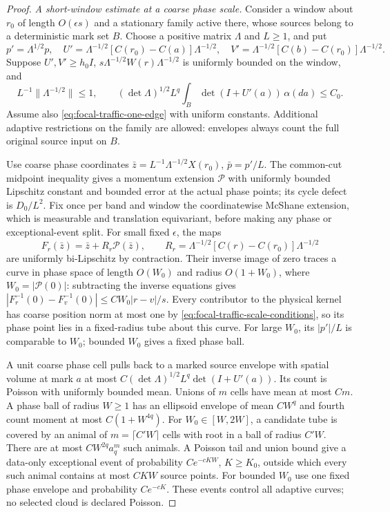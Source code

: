 \documentclass[11pt,reqno]{amsart}
\theoremstyle{definition}
\theoremstyle{remark}
\numberwithin{equation}{section}
\begin{document}
\begin{proof}
\emph{A short-window estimate at a coarse phase scale.}
Consider a window about $r_0$ of length $O(\epsilon s)$ and a
stationary family active there, whose sources belong to a deterministic
mark set $B$. Choose a positive matrix $\Lambda$ and $L\ge1$, and put
\[
 p'=\Lambda^{1/2}p,\quad
 U'=\Lambda^{-1/2}[C(r_0)-C(a)]\Lambda^{-1/2},\quad
 V'=\Lambda^{-1/2}[C(b)-C(r_0)]\Lambda^{-1/2}.
\]
Suppose $U',V'\ge h_0I$,
$s\Lambda^{-1/2}W(r)\Lambda^{-1/2}$ is uniformly bounded on the window,
and
\begin{equation}\label{eq:focal-traffic-scale-conditions}
 L^{-1}\|\Lambda^{-1/2}\|\le1,\qquad
 (\det\Lambda)^{1/2}L^q
       \int_B\det(I+U'(a))\,\alpha(da)\le C_0.
\end{equation}
Assume also \eqref{eq:focal-traffic-one-edge} with uniform constants.
Additional adaptive restrictions on the family are allowed: envelopes
always count the full original source input on $B$.

Use coarse phase coordinates
$\bar z=L^{-1}\Lambda^{-1/2}X(r_0)$, $\bar p=p'/L$.
The common-cut midpoint inequality gives a momentum extension
$\mathcal P$ with uniformly bounded Lipschitz constant and bounded
error at the actual phase points; its cycle defect is $D_0/L^2$.
Fix once per band and window the coordinatewise McShane extension,
which is measurable and translation equivariant, before making any
phase or exceptional-event split. For small fixed $\epsilon$, the maps
\[
 F_r(\bar z)=\bar z+R_r\mathcal P(\bar z),\qquad
 R_r=\Lambda^{-1/2}[C(r)-C(r_0)]\Lambda^{-1/2}
\]
are uniformly bi-Lipschitz by contraction. Their inverse image of zero
traces a curve in phase space of length $O(W_0)$ and radius $O(1+W_0)$,
where $W_0=|\mathcal P(0)|$: subtracting the inverse equations gives
$|F_r^{-1}(0)-F_v^{-1}(0)|\le C W_0|r-v|/s$.
Every contributor to the physical kernel has coarse position norm at
most one by \eqref{eq:focal-traffic-scale-conditions}, so its phase point
lies in a fixed-radius tube about this curve. For large $W_0$, its
$|p'|/L$ is comparable to $W_0$; bounded $W_0$ gives a fixed phase ball.

A unit coarse phase cell pulls back to a marked source envelope with
spatial volume at mark $a$ at most
$C(\det\Lambda)^{1/2}L^q\det(I+U'(a))$. Its count is Poisson with
uniformly bounded mean. Unions of $m$ cells have mean at most $Cm$.
A phase ball of radius $W\ge1$ has an ellipsoid envelope of mean
$CW^q$ and fourth count moment at most $C(1+W^{4q})$.
For $W_0\in[W,2W]$, a candidate tube is covered by an animal of
$m=\lceil C'W\rceil$ cells with root in a ball of radius $C'W$.
There are at most $CW^{2q}a_q^m$ such animals. A Poisson tail and
union bound give a data-only exceptional event of probability
$Ce^{-cKW}$, $K\ge K_0$, outside which every such animal contains
at most $CKW$ source points. For bounded $W_0$ use one fixed phase
envelope and probability $Ce^{-cK}$. These events control all adaptive
curves; no selected cloud is declared Poisson.


\end{proof}
\end{document}
